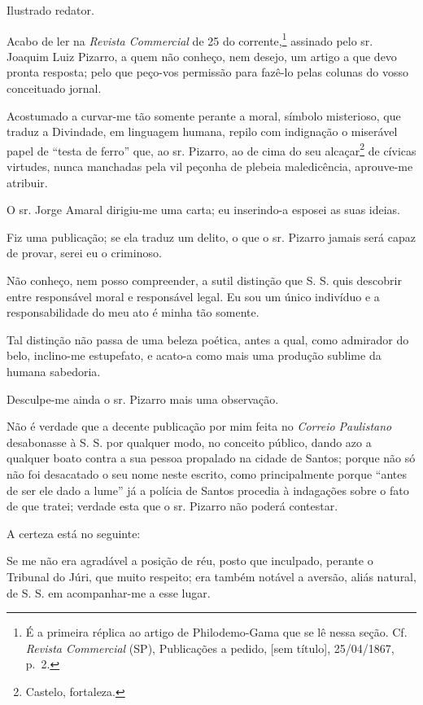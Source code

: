 \asterisc{}

Ilustrado redator.

Acabo de ler na \emph{Revista Commercial} de 25 do
corrente,\textsuperscript{⁠}\footnote{ É a primeira réplica ao artigo
  de Philodemo-Gama que se lê nessa seção. Cf. \emph{Revista Commercial}
  (SP), Publicações a pedido, {[}sem título{]}, 25/04/1867, p.~2.}
assinado pelo sr. Joaquim Luiz Pizarro, a quem não conheço, nem desejo,
um artigo a que devo pronta resposta; pelo que peço-vos permissão para
fazê-lo pelas colunas do vosso conceituado jornal.

Acostumado a curvar-me tão somente perante a moral, símbolo misterioso,
que traduz a Divindade, em linguagem humana, repilo com indignação o
miserável papel de ``testa de ferro'' que, ao sr. Pizarro, ao de cima do
seu alcaçar\textsuperscript{⁠}\footnote{Castelo, fortaleza.} de cívicas
virtudes, nunca manchadas pela vil peçonha de plebeia maledicência,
aprouve-me atribuir.

O sr. Jorge Amaral dirigiu-me uma carta; eu inserindo-a esposei as suas
ideias.

Fiz uma publicação; se ela traduz um delito, o que o sr. Pizarro jamais
será capaz de provar, serei eu o criminoso.

Não conheço, nem posso compreender, a sutil distinção que S. S. quis
descobrir entre responsável moral e responsável legal. Eu sou um único
indivíduo e a responsabilidade do meu ato é minha tão somente.

Tal distinção não passa de uma beleza poética, antes a qual, como
admirador do belo, inclino-me estupefato, e acato-a como mais uma
produção sublime da humana sabedoria.

Desculpe-me ainda o sr. Pizarro mais uma observação.

Não é verdade que a decente publicação por mim feita no \emph{Correio
Paulistano} desabonasse à S. S. por qualquer modo, no conceito público,
dando azo a qualquer boato contra a sua pessoa propalado na cidade de
Santos; porque não só não foi desacatado o seu nome neste escrito, como
principalmente porque ``antes de ser ele dado a lume'' já a polícia de
Santos procedia à indagações sobre o fato de que tratei; verdade esta
que o sr. Pizarro não poderá contestar.

A certeza está no seguinte:

Se me não era agradável a posição de réu, posto que inculpado, perante o
Tribunal do Júri, que muito respeito; era também notável a aversão,
aliás natural, de S. S. em acompanhar-me a esse lugar.

